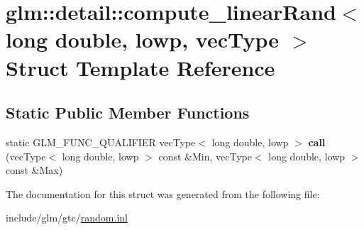 \hypertarget{structglm_1_1detail_1_1compute__linearRand_3_01long_01double_00_01lowp_00_01vecType_01_4}{}\section{glm\+:\+:detail\+:\+:compute\+\_\+linear\+Rand$<$ long double, lowp, vec\+Type $>$ Struct Template Reference}
\label{structglm_1_1detail_1_1compute__linearRand_3_01long_01double_00_01lowp_00_01vecType_01_4}
\subsection*{Static Public Member Functions}
\begin{DoxyCompactItemize}
\item 
\mbox{\label{structglm_1_1detail_1_1compute__linearRand_3_01long_01double_00_01lowp_00_01vecType_01_4_a946041e54f74d77bc7ca81ae69eaaffc}} 
static G\+L\+M\+\_\+\+F\+U\+N\+C\+\_\+\+Q\+U\+A\+L\+I\+F\+I\+ER vec\+Type$<$ long double, lowp $>$ {\bfseries call} (vec\+Type$<$ long double, lowp $>$ const \&Min, vec\+Type$<$ long double, lowp $>$ const \&Max)
\end{DoxyCompactItemize}


The documentation for this struct was generated from the following file\+:\begin{DoxyCompactItemize}
\item 
include/glm/gtc/\hyperlink{random_8inl}{random.\+inl}\end{DoxyCompactItemize}
